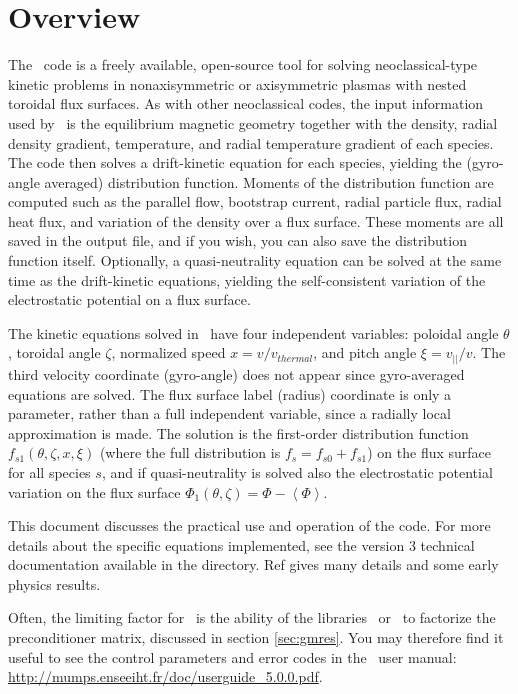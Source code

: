 \chapter{Overview}


The \sfincs~code is a freely available, open-source tool for solving neoclassical-type kinetic problems in nonaxisymmetric or axisymmetric plasmas
with nested toroidal flux surfaces.
As with other neoclassical codes, the input information used by \sfincs~is the equilibrium magnetic geometry together with the density, radial density gradient, temperature,
and radial temperature gradient of each species.  The code then solves a drift-kinetic equation for each species,
yielding the (gyro-angle averaged) distribution function.  Moments of the distribution function are computed such as the parallel
flow, bootstrap current, radial particle flux, radial heat flux, and variation of the density over a flux surface.  
These moments are all saved in the output file, and if you wish, you can also save the distribution function itself.
Optionally, a quasi-neutrality
equation can be solved at the same time as the drift-kinetic equations, yielding the self-consistent variation of the electrostatic potential on a flux surface.

The kinetic equations solved in \sfincs~have four independent variables: poloidal angle $\theta$, toroidal angle $\zeta$,
normalized speed $x = v / v_{thermal}$, and pitch angle $\xi = v_{||}/v$.  The third velocity coordinate (gyro-angle) does not appear
since gyro-averaged equations are solved.  The flux surface label (radius) coordinate is only a parameter, rather than a full independent variable,
since a radially local approximation is made. 
The solution is the first-order distribution function $f_{s1} \left(\theta, \zeta, x, \xi\right)$ (where the full distribution is $f_s = f_{s0} + f_{s1}$) on the flux surface for all species $s$, and if quasi-neutrality is solved also the electrostatic potential variation on the flux surface $\Phi_1 \left(\theta, \zeta\right) = \Phi-\left<\Phi\right>$. 

This document discusses the practical use and operation of the code.  For more details about the specific equations implemented,
see the version 3 technical documentation available in the  directory.
Ref \cite{sfincsPaper} gives many details and some early physics results.

Often, the limiting factor for \sfincs~is the ability of the libraries \mumps~or \superludist~to factorize the preconditioner matrix, discussed in section \ref{sec:gmres}.
You may therefore find it useful to see the control parameters and error codes in the \mumps~user manual:
\url{http://mumps.enseeiht.fr/doc/userguide_5.0.0.pdf}.


